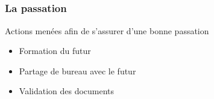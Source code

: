 \subsection{}
\begin{frame}
\frametitle{La passation}
\begin{block}{Actions menées afin de s'assurer d'une bonne passation}
\begin{itemize}
	\item Formation du futur \CP{}
	\item Partage de bureau avec le futur \CP{}
	\item Validation des documents
\end{itemize}
\end{block}
\end{frame}



